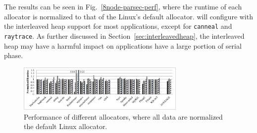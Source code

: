 

 The results can be seen in Fig.~\ref{8node-parsec-perf}, where the runtime of each allocator is normalized to that of the Linux's default allocator. \NM{} will configure with the interleaved heap support for most applications, except for \texttt{canneal} and \texttt{raytrace}. As further discussed in Section~\ref{sec:interleavedheap}, the interleaved heap may have a harmful impact on applications have a large portion of serial phase.


\begin{figure}[!ht]
    \centering
   
    \includegraphics[width=3.2in]{figure/8-node-parsec-perf.pdf}
    \caption{Performance of different allocators, where all data are normalized the default Linux allocator. \label{sec:perf}}
 \end{figure}


